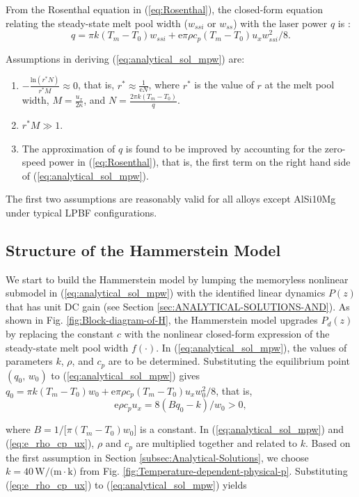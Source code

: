 \documentclass [11pt, proquest] {uwthesis}[2020/02/24]
\begin{document}
From the Rosenthal equation in (\ref{eq:Rosenthal}), the closed-form
equation relating the steady-state melt pool width ($w_{ssi}$ or
$w_{ss}$) with the laser power $q$ is \cite{tang2017prediction}:
\noindent 
\begin{equation}
q=\pi k(T_{m}-T_{0})w_{ssi}+\text{e}\pi\rho c_{p}(T_{m}-T_{0})u_{x}w_{ssi}^{2}/8.\label{eq:analytical_sol_mpw}
\end{equation}

Assumptions in deriving (\ref{eq:analytical_sol_mpw}) are:
\begin{enumerate}
\item $-\frac{\text{ln}(r^{*}N)}{r^{*}M}\approx0$, that is, $r^{*}\approx\frac{1}{\text{e}N}$,
where $r^{*}$ is the value of $r$ at the melt pool width, $M=\frac{u_{x}}{2\kappa}$,
and $N=\frac{2\pi k(T_{m}-T_{0})}{q}$. 
\item $r^{*}M\gg1$.
\item The approximation of $q$ is found to be improved by accounting for
the zero-speed power in (\ref{eq:Rosenthal}), that is, the first
term on the right hand side of (\ref{eq:analytical_sol_mpw}). 
\end{enumerate}
The first two assumptions are reasonably valid for all alloys except
AlSi10Mg under typical LPBF configurations.

\subsection{Structure of the Hammerstein Model}

We start to build the Hammerstein model by lumping the memoryless
nonlinear submodel in (\ref{eq:analytical_sol_mpw}) with the identified
linear dynamics $P(z)$ that has unit DC gain (see Section \ref{sec:ANALYTICAL-SOLUTIONS-AND}).
As shown in Fig. \ref{fig:Block-diagram-of-H}, the Hammerstein model
upgrades $P_{d}(z)$ by replacing the constant $c$ with the nonlinear
closed-form expression of the steady-state melt pool width $f(\cdot)$.
In (\ref{eq:analytical_sol_mpw}), the values of parameters $k$,
$\rho$, and $c_{p}$ are to be determined. Substituting the equilibrium point $(q_{0},\,w_{0})$ to (\ref{eq:analytical_sol_mpw})
gives $q_{0}=\pi k(T_{m}-T_{0})w_{0}+\text{e}\pi\rho c_{p}(T_{m}-T_{0})u_{x}w_{0}^{2}/8$,
that is,
\noindent 
\begin{equation}
\text{e}\rho c_{p}u_{x}=8(Bq_{0}-k)/w_{0}>0,\label{eq:e_rho_cp_ux}
\end{equation}

\noindent where $B=1/\text{[}\pi(T_{m}-T_{0})w_{0}]$ is a constant.
In (\ref{eq:analytical_sol_mpw}) and (\ref{eq:e_rho_cp_ux}), $\rho$
and $c_{p}$ are multiplied together and related to $k$. Based on
the first assumption in Section \ref{subsec:Analytical-Solutions},
we choose $k=40\,\text{W/(m}\cdot\text{k)}$ from Fig. \ref{fig:Temperature-dependent-physical-p}.
Substituting (\ref{eq:e_rho_cp_ux}) to (\ref{eq:analytical_sol_mpw})
yields
\end{document}
